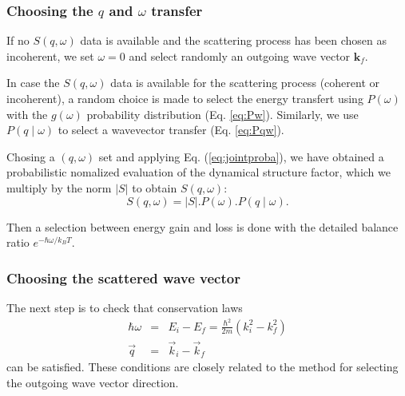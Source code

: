 \subsubsection{Choosing the $q$ and $\omega$ transfer}

If no $S(q, \omega)$ data is available and the scattering process has been chosen as incoherent, we set $\omega=0$ and select randomly an outgoing wave vector $\boldsymbol{k}_f$.

In case the $S(q, \omega)$ data is available for the scattering process (coherent or incoherent), a random choice is made to select the energy transfert using $P(\omega)$ with the $g(\omega)$ probability distribution (Eq. \ref{eq:Pw}).
Similarly, we use $P(q \mid \omega)$ to select a wavevector transfer (Eq. \ref{eq:Pqw}).

Chosing a $(q, \omega)$ set and applying Eq. (\ref{eq:jointproba}), we have obtained a probabilistic nomalized evaluation of the dynamical structure factor, which we multiply by the norm $|S|$ to obtain $S(q, \omega)$:
\begin{equation}
S(q, \omega) = |S|. P(\omega).P(q \mid \omega) .
\end{equation}

Then a selection between energy gain and loss is done with the detailed balance ratio $e^{-\hbar \omega / k_B T}$.

\subsubsection{Choosing the scattered wave vector}

The next step is to check that conservation laws
\begin{eqnarray}
\hbar \omega &=& E_i - E_f = \frac{\hbar^2}{2m}(k_i^2 - k_f^2) \label{eq:q-transfert} \\
\vec q &=& \vec k_i - \vec k_f \label{eq:w-transfert}
\end{eqnarray}
can be satisfied. These conditions are closely related to the method for selecting the outgoing wave vector direction.


